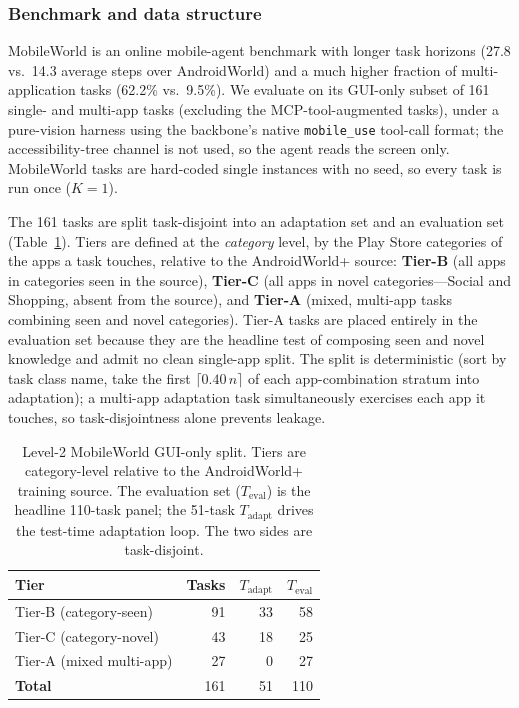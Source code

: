\subsubsection{Benchmark and data structure}
\label{sec:exp-cross-data}

MobileWorld is an online mobile-agent benchmark with longer task horizons (27.8
vs.\ 14.3 average steps over AndroidWorld) and a much higher fraction of
multi-application tasks (62.2\% vs.\ 9.5\%). We evaluate on its GUI-only subset
of 161 single- and multi-app tasks (excluding the MCP-tool-augmented tasks),
under a pure-vision harness using the backbone's native \texttt{mobile\_use}
tool-call format; the accessibility-tree channel is not used, so the agent reads
the screen only. MobileWorld tasks are hard-coded single instances with no seed,
so every task is run once ($K{=}1$).

The 161 tasks are split task-disjoint into an adaptation set and an evaluation
set (Table~\ref{tab:mw-splits}). Tiers are defined at the \emph{category} level,
by the Play Store categories of the apps a task touches, relative to the
AndroidWorld+ source: \textbf{Tier-B} (all apps in categories seen in the
source), \textbf{Tier-C} (all apps in novel categories---Social and Shopping,
absent from the source), and \textbf{Tier-A} (mixed, multi-app tasks combining
seen and novel categories). Tier-A tasks are placed entirely in the evaluation
set because they are the headline test of composing seen and novel knowledge and
admit no clean single-app split. The split is deterministic (sort by task class
name, take the first $\lceil 0.40\,n\rceil$ of each app-combination stratum into
adaptation); a multi-app adaptation task simultaneously exercises each app it
touches, so task-disjointness alone prevents leakage.

\begin{table}[t]
\small
\centering
\begin{tabular}{lrrr}
\hline
\textbf{Tier} & \textbf{Tasks} & \textbf{$T_{\text{adapt}}$} & \textbf{$T_{\text{eval}}$} \\
\hline
Tier-B (category-seen)   & 91  & 33 & 58 \\
Tier-C (category-novel)  & 43  & 18 & 25 \\
Tier-A (mixed multi-app) & 27  &  0 & 27 \\
\hline
\textbf{Total}           & 161 & 51 & 110 \\
\hline
\end{tabular}
\caption{Level-2 MobileWorld GUI-only split. Tiers are category-level relative
to the AndroidWorld+ training source. The evaluation set ($T_{\text{eval}}$) is
the headline 110-task panel; the 51-task $T_{\text{adapt}}$ drives the test-time
adaptation loop. The two sides are task-disjoint.}
\label{tab:mw-splits}
\end{table}

